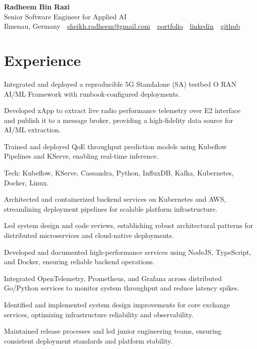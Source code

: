 \documentclass[10pt,a4paper]{resume}
\makeatletter
\newcommand{\Portfolio}{https://radheem.github.io/my-cv}
\newcommand{\PortfolioText}{portfolio}
\newcommand{\GitHub}{https://github.com/radheem}
\newcommand{\LinkedIn}{https://www.linkedin.com/in/radheem-razi}
\newcommand{\Email}{sheikh.radheem@gmail.com}
\makeatother
\begin{document}
\begin{center}
  {\huge\bfseries Radheem Bin Razi}\\[3pt]
  {\large Senior Software Engineer for Applied AI}\\[6pt]
  \small
  Ilmenau, Germany \,\textbar\,
  \href{mailto:\Email}{\Email} \,\textbar\,
  \href{\Portfolio}{\PortfolioText} \,\textbar\,
  \href{\LinkedIn}{linkedin} \,\textbar\,
  \href{\GitHub}{github}
\end{center}
\vspace{2pt}

\section{Experience}

\bullets
  \item Integrated and deployed a reproducible 5G Standalone (SA) testbed O RAN AI/ML Framework with runbook-configured deployments.
  \item Developed xApp to extract live radio performance telemetry over E2 interface and publish it to a message broker, providing a high-fidelity data source for AI/ML extraction.
  \item Trained and deployed QoE throughput prediction models using Kubeflow Pipelines and KServe, enabling real-time inference.
  \item Tech: Kubeflow, KServe, Cassandra, Python, InfluxDB, Kafka, Kubernetes, Docker, Linux.
\bulletsend
\vspace{1.5pt}
\bullets
  \item Architected and containerized backend services on Kubernetes and AWS, streamlining deployment pipelines for scalable platform infrastructure.
  \item Led system design and code reviews, establishing robust architectural patterns for distributed microservices and cloud-native deployments.
  \item Developed and documented high-performance services using NodeJS, TypeScript, and Docker, ensuring reliable backend operations.
\bulletsend
\vspace{1.5pt}
\bullets
  \item Integrated OpenTelemetry, Prometheus, and Grafana across distributed Go/Python services to monitor system throughput and reduce latency spikes.
  \item Identified and implemented system design improvements for core exchange services, optimizing infrastructure reliability and observability.
  \item Maintained release processes and led junior engineering teams, ensuring consistent deployment standards and platform stability.
\bulletsend
\vspace{1.5pt}
\end{document}
